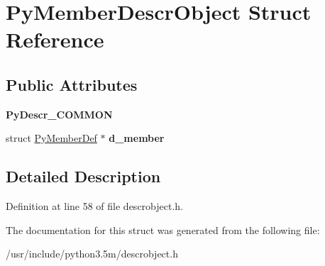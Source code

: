 \hypertarget{structPyMemberDescrObject}{}\section{Py\+Member\+Descr\+Object Struct Reference}
\label{structPyMemberDescrObject}
\subsection*{Public Attributes}
\begin{DoxyCompactItemize}
\item 
{\bfseries Py\+Descr\+\_\+\+C\+O\+M\+M\+ON}\hypertarget{structPyMemberDescrObject_a7b959892ce5a401b22c67e3c5162bee0}{}\label{structPyMemberDescrObject_a7b959892ce5a401b22c67e3c5162bee0}

\item 
struct \hyperlink{structPyMemberDef}{Py\+Member\+Def} $\ast$ {\bfseries d\+\_\+member}\hypertarget{structPyMemberDescrObject_a3169c9bdd945c9cf780b3940d3300387}{}\label{structPyMemberDescrObject_a3169c9bdd945c9cf780b3940d3300387}

\end{DoxyCompactItemize}


\subsection{Detailed Description}


Definition at line 58 of file descrobject.\+h.



The documentation for this struct was generated from the following file\+:\begin{DoxyCompactItemize}
\item 
/usr/include/python3.\+5m/descrobject.\+h\end{DoxyCompactItemize}
